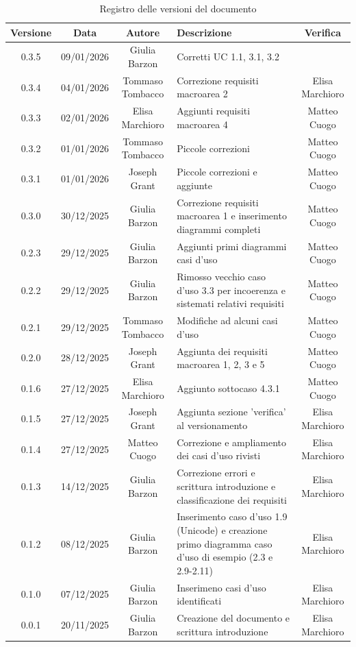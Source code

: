 \documentclass[11pt,a4paper]{article}
\begin{document}
\begin{table}[H]
    \centering
    \begin{tabular}{|c|c|c|>{\raggedright\arraybackslash}p{}|c|}
        \hline
        \textbf{Versione} & \textbf{Data} & \textbf{Autore} & \textbf{Descrizione} & \textbf{Verifica} \\
        \hline
        0.3.5 & 09/01/2026 & Giulia Barzon & Corretti UC 1.1, 3.1, 3.2 & \\
        \hline
        0.3.4 & 04/01/2026 & Tommaso Tombacco & Correzione requisiti macroarea 2 & Elisa Marchioro\\
        \hline
        0.3.3 & 02/01/2026 & Elisa Marchioro & Aggiunti requisiti macroarea 4 &  Matteo Cuogo\\
        \hline
        0.3.2 & 01/01/2026 & Tommaso Tombacco & Piccole correzioni & Matteo Cuogo\\
        \hline
        0.3.1 & 01/01/2026 & Joseph Grant & Piccole correzioni e aggiunte &  Matteo Cuogo\\
        \hline
        0.3.0 & 30/12/2025 & Giulia Barzon & Correzione requisiti macroarea 1 e inserimento diagrammi completi & Matteo Cuogo \\
        \hline
        0.2.3 & 29/12/2025 & Giulia Barzon & Aggiunti primi diagrammi casi d'uso &  Matteo Cuogo \\
        \hline
        0.2.2 & 29/12/2025 & Giulia Barzon & Rimosso vecchio caso d'uso 3.3 per incoerenza e sistemati relativi requisiti & Matteo Cuogo \\
        \hline
        0.2.1 & 29/12/2025 & Tommaso Tombacco & Modifiche ad alcuni casi d'uso &  Matteo Cuogo\\ 
        \hline
        0.2.0 & 28/12/2025 & Joseph Grant & Aggiunta dei requisiti macroarea 1, 2, 3 e 5 &  Matteo Cuogo\\ 
        \hline
        0.1.6 & 27/12/2025 & Elisa Marchioro & Aggiunto sottocaso 4.3.1 & Matteo Cuogo\\ 
        \hline
        0.1.5 & 27/12/2025 & Joseph Grant & Aggiunta sezione 'verifica' al versionamento & Elisa Marchioro\\ 
        \hline
        0.1.4 & 27/12/2025 & Matteo Cuogo & Correzione e ampliamento dei casi d'uso rivisti & Elisa Marchioro\\
        \hline
        0.1.3 & 14/12/2025 & Giulia Barzon & Correzione errori e scrittura introduzione e classificazione dei requisiti & Elisa Marchioro\\
        \hline
        0.1.2 & 08/12/2025 & Giulia Barzon & Inserimento caso d'uso 1.9 (Unicode) e creazione primo diagramma caso d'uso di esempio (2.3 e 2.9-2.11) & Elisa Marchioro\\
        \hline
        0.1.0 & 07/12/2025 & Giulia Barzon & Inserimeno casi d'uso identificati & Elisa Marchioro\\
        \hline
        0.0.1 & 20/11/2025 & Giulia Barzon & Creazione del documento e scrittura introduzione & Elisa Marchioro\\
        \hline
    \end{tabular}
    \caption{Registro delle versioni del documento}
    \label{tab:versionamento}
\end{table}
\end{document}
